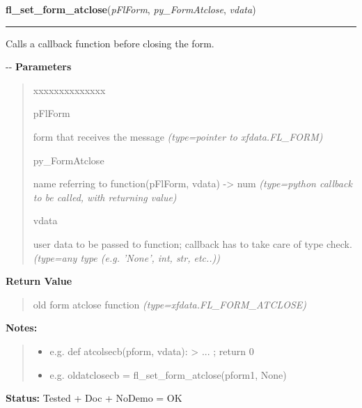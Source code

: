 \hspace{.8\funcindent}\begin{boxedminipage}{\funcwidth}

    \raggedright \textbf{fl\_set\_form\_atclose}(\textit{pFlForm}, \textit{py\_FormAtclose}, \textit{vdata})

    \vspace{-1.5ex}

    \rule{\textwidth}{0.5\fboxrule}
\setlength{\parskip}{2ex}

Calls a callback function before closing the form.

-{}-
\setlength{\parskip}{1ex}
      \textbf{Parameters}
      \vspace{-1ex}

      \begin{quote}
        \begin{Ventry}{xxxxxxxxxxxxxx}

          \item[pFlForm]


form that receives the message
            {\it (type=pointer to xfdata.FL\_FORM)}

          \item[py\_FormAtclose]


name referring to function(pFlForm, vdata) -> num
            {\it (type=python callback to be called, with returning value)}

          \item[vdata]


user data to be passed to function; callback has to take care of
type check.
            {\it (type=any type (e.g. 'None', int, str, etc..))}

        \end{Ventry}

      \end{quote}

      \textbf{Return Value}
    \vspace{-1ex}

      \begin{quote}

old form atclose function
      {\it (type=xfdata.FL\_FORM\_ATCLOSE)}

      \end{quote}

\textbf{Notes:}
\begin{quote}
  \begin{itemize}

  \item
    \setlength{\parskip}{0.6ex}

e.g. def atcolsecb(pform, vdata): > ... ; return 0


  \item 
e.g. oldatclosecb = fl\_set\_form\_atclose(pform1, None)


\end{itemize}

\end{quote}

\textbf{Status:} 
Tested + Doc + NoDemo = OK


    \end{boxedminipage}

